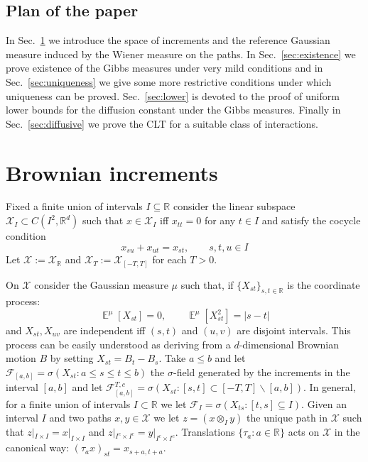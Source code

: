 \documentclass[a4paper,12pt,reqno]{amsart}
\DeclareMathOperator{\expect}{{\mathbb E}}
\newcommand{\R}{\mathbb{R}}
\newcommand{\X}{\mathcal{X}}
\newcommand{\F}{\mathcal{F}}
\begin{document}
\subsection*{
Plan of the paper} In Sec.~\ref{sect:increments} we introduce the
space of increments and the reference Gaussian measure induced by the
Wiener measure on the paths. In Sec.~\ref{sec:existence} we prove
existence of the Gibbs measures under very mild conditions and in
Sec.~\ref{sec:uniqueness} we give some more restrictive conditions
under which uniqueness can be proved. Sec.~\ref{sec:lower} is devoted to the proof of uniform lower bounds for the diffusion constant under the Gibbs measures.
Finally in Sec.~\ref{sec:diffusive} we prove the CLT for a suitable
class of interactions.
 
 
\section{Brownian increments}
\label{sect:increments}
Fixed a finite union of intervals $I \subseteq \R$ consider the linear subspace $\X_I \subset C(I^2,\R^d)$ such that $x \in \X_I$
iff $x_{tt} = 0$ for any $t \in I$ and satisfy the cocycle condition
\begin{equation}
  \label{eq:cocycle}
 x_{su} + x_{ut} = x_{st}, \qquad s,t,u \in I 
\end{equation}
Let $\X := \X_\R$ and $\X_T := \X_{[-T,T]}$ for each $T > 0$.


On $\X$ consider the Gaussian measure $\mu$ such that, if $\{X_{st}\}_{s,t \in\R}$ is
the coordinate process:
$$
\expect^\mu [X_{st }]= 0, \qquad \expect^\mu [X_{st}^2] = |s-t|
$$
and $X_{st},X_{uv}$ are independent iff $(s,t)$ and $(u,v)$ are
disjoint intervals.
This process can be easily understood as deriving from a $d$-dimensional Brownian
motion $B$ by setting $X_{st} = B_t - B_s$. 
Take $a \le b$ and let $\mathcal{F}_{[a,b]} = \sigma(X_{st} : a \le s \le t \le b)$ the
$\sigma$-field generated by the increments in the interval $[a,b]$ and
let
 $\mathcal{F}^{T,c}_{[a,b]} = \sigma(X_{st} : [s,t] \subset [-T,T] \backslash [a,b])$. In general, for a finite union of intervals $I \subset \R$ we let $\F_I = \sigma(X_{ts}: [t,s] \subseteq I)$.
Given an interval $I$ and two paths $x,y \in \X$ we let 
 $z = (x \otimes_I y)$ the
 unique path in $\X$ such that $z|_{I\times
  I} = x |_{I\times  I}$ and $z|_{I^c\times
  I^c} = y |_{I^c\times  I^c}$. Translations $\{\tau_a : a\in\R\}$ acts on $\X$ in the canonical way: $(\tau_a x)_{st} = x_{s+a,t+a}$.
\end{document}
